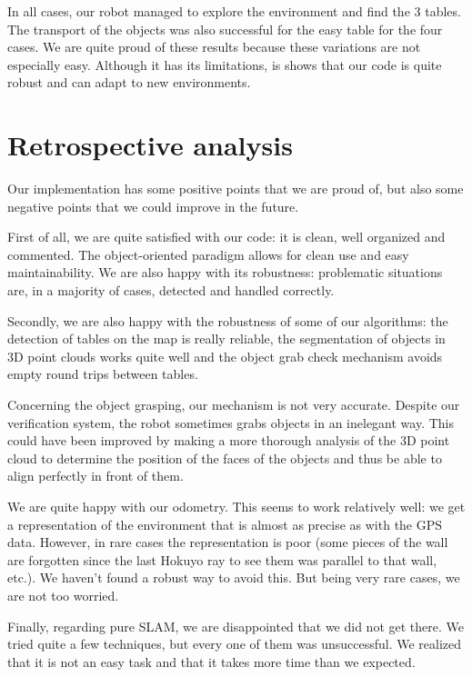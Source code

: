 \documentclass[a4paper, 10pt, conference]{ieeeconf}
\begin{document}
    In all cases, our robot managed to explore the environment and find the $3$ tables. The transport of the objects was also successful for the easy table for the four cases. We are quite proud of these results because these variations are not especially easy. Although it has its limitations, is shows that our code is quite robust and can adapt to new environments.
    
    
    \section{Retrospective analysis}
    
    Our implementation has some positive points that we are proud of, but also some negative points that we could improve in the future.
    
    First of all, we are quite satisfied with our code: it is clean, well organized and commented. The object-oriented paradigm allows for clean use and easy maintainability. We are also happy with its robustness: problematic situations are, in a majority of cases, detected and handled correctly.
    
    Secondly, we are also happy with the robustness of some of our algorithms: the detection of tables on the map is really reliable, the segmentation of objects in 3D point clouds works quite well and the object grab check mechanism avoids empty round trips between tables.
    
    Concerning the object grasping, our mechanism is not very accurate. Despite our verification system, the robot sometimes grabs objects in an inelegant way. This could have been improved by making a more thorough analysis of the 3D point cloud to determine the position of the faces of the objects and thus be able to align perfectly in front of them.
    
    We are quite happy with our odometry. This seems to work relatively well: we get a representation of the environment that is almost as precise as with the GPS data. However, in rare cases the representation is poor (some pieces of the wall are forgotten since the last Hokuyo ray to see them was parallel to that wall, etc.). We haven't found a robust way to avoid this. But being very rare cases, we are not too worried.
    
    Finally, regarding pure SLAM, we are disappointed that we did not get there. We tried quite a few techniques, but every one of them was unsuccessful. We realized that it is not an easy task and that it takes more time than we expected.
    
\end{document}
